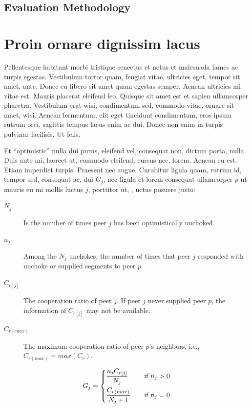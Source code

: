 \subsection{Evaluation Methodology}

\section{Proin ornare dignissim lacus}
Pellentesque habitant morbi tristique senectus et netus et malesuada fames ac turpis egestas. Vestibulum tortor quam, feugiat vitae, ultricies eget, tempor sit amet, ante. Donec eu libero sit amet quam egestas semper. Aenean ultricies mi vitae est. Mauris placerat eleifend leo. Quisque sit amet est et sapien ullamcorper pharetra. Vestibulum erat wisi, condimentum sed, commodo vitae, ornare sit amet, wisi. Aenean fermentum, elit eget tincidunt condimentum, eros ipsum rutrum orci, sagittis tempus lacus enim ac dui. Donec non enim in turpis pulvinar facilisis. Ut felis.

Et ``optimistic'' nulla dui purus, eleifend vel, consequat non, dictum porta, nulla. Duis ante mi, laoreet ut, commodo eleifend, cursus nec, lorem. Aenean eu est. Etiam imperdiet turpis. Praesent nec augue. Curabitur ligula quam, rutrum id, tempor sed, consequat ac, dui $G_j$, nec ligula et lorem consequat ullamcorper $p$ ut mauris eu mi mollis luctus $j$, porttitor ut, , uctus posuere justo:

\begin{description}
  \item[$N_j$] Is the number of times peer $j$ has been optimistically unchoked.
  \item[$n_j$] Among the $N_j$ unchokes, the number of times that peer $j$ responded with unchoke or supplied segments to peer $p$.
  \item[$C_{r[j]}$] The cooperation ratio of peer $j$. If peer $j$ never supplied peer $p$, the information of $C_{r[j]}$ may not be available.
  \item[$C_{r (max)}$] The maximum cooperation ratio of peer $p$’s neighbors, i.e., $C_{r (max)} = max(C_r)$.
\end{description}

\begin{equation}
\label{unchoke_gain}
 G_j =
  \begin{dcases}
    \frac{n_j C_{r[j]}}{N_j} &\quad \text{if } n_j > 0\\
    \frac{C_{r (max)}}{N_j + 1} &\quad \text{if } n_j = 0
  \end{dcases}
\end{equation}

